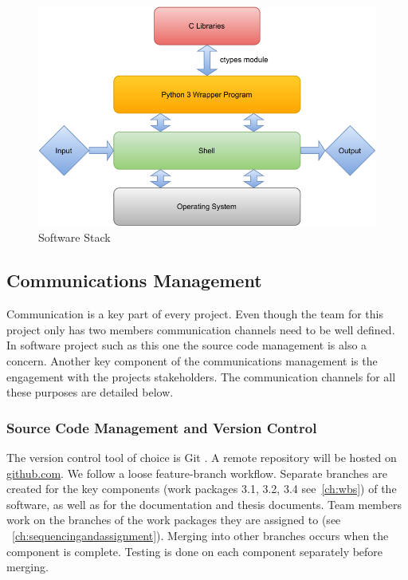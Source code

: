 \begin{figure}
  \centering
  \includegraphics{data/figures/stack.pdf}
  \caption{Software Stack}
  \label{fig:projectphases}
\end{figure}


\subsection{Communications Management}
\label{ch:communicationsmanagement}
Communication is a key part of every project. Even though the team for this project only has two members communication channels need to be well defined. In software project such as this one the source code management is also a concern. Another key component of the communications management is the engagement with the projects stakeholders. The communication channels for all these purposes are detailed below.

\subsubsection{Source Code Management and Version Control}
\label{ch:versioncontrol}
The version control tool of choice is Git \cite{git}. A remote repository will be hosted on \url{github.com}. We follow a loose feature-branch workflow. Separate branches are created for the key components (work packages 3.1, 3.2, 3.4 see~\ref{ch:wbs}) of the software, as well as for the documentation and thesis documents. Team members work on the branches of the work packages they are assigned to (see ~\ref{ch:sequencingandassignment}). Merging into other branches occurs when the component is complete. Testing is done on each component separately before merging.


